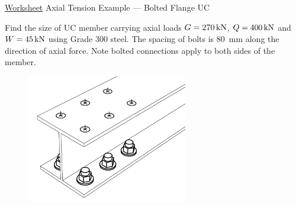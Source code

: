 \begin{exmp}\href{run:./WORKSHEET/CH03/EX3.BFUC.sm}{Worksheet}
Axial Tension Example --- Bolted Flange UC

Find the size of UC member carrying axial loads $G=\SI{270}{\kilo\newton}$, $Q=\SI{400}{\kilo\newton}$ and $W=\SI{45}{\kilo\newton}$ using Grade 300 steel. The spacing of bolts is \SI{80}{\mm} along the direction of axial force. Note bolted connections apply to both sides of the member.
\begin{figure}[H]
\includegraphics[width=7cm]{PIC/CH04/UC}

\end{figure}
\end{exmp}
